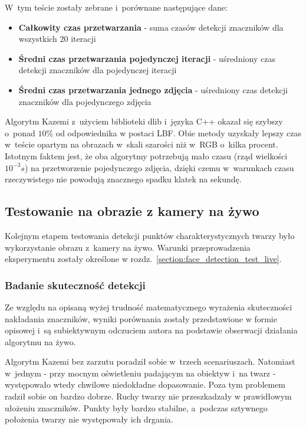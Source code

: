 W~tym teście zostały zebrane i~porównane następujące dane:

\begin{itemize}
    \item \textbf{Całkowity czas przetwarzania} - suma czasów detekcji znaczników dla wszystkich 20 iteracji
    \item \textbf{Średni czas przetwarzania pojedynczej iteracji} - uśredniony czas detekcji znaczników dla pojedynczej iteracji
    \item \textbf{Średni czas przetwarzania jednego zdjęcia} - uśredniony czas detekcji znaczników dla pojedynczego zdjęcia
\end{itemize}



Algorytm Kazemi z~użyciem biblioteki dlib i~języka C++ okazał się szybszy o~ponad $10\%$ od odpowiednika w postaci LBF. Obie metody uzyskały lepszy czas w~teście opartym na obrazach w~skali szarości niż w~RGB o~kilka procent. Istotnym faktem jest, że oba algorytmy potrzebują mało czasu (rząd wielkości $10^{-3} s$) na przetworzenie pojedynczego zdjęcia, dzięki czemu w~warunkach czasu rzeczywistego nie powodują znacznego spadku klatek na sekundę. 

\subsection{Testowanie na obrazie z kamery na żywo}

Kolejnym etapem testowania detekcji punktów charakterystycznych twarzy było wykorzystanie obrazu z~kamery na żywo. Warunki przeprowadzenia eksperymentu zostały określone w rozdz.~\hyperref[{section:face_detection_test_live}]{\ref{section:face_detection_test_live}}.

\subsubsection{Badanie skuteczność detekcji} \label{section:facemark_live_detection}

Ze względu na opisaną wyżej trudność matematycznego wyrażenia skuteczności nakładania znaczników, wyniki porównania zostały przedstawione w formie opisowej i~są subiektywnym odczuciem autora na podstawie obserwacji działania algorytmu na żywo.

\vspace{5mm}

Algorytm Kazemi bez zarzutu poradził sobie w~trzech scenariuszach. Natomiast w~jednym - przy mocnym oświetleniu padającym na obiektyw i~na twarz - występowało wtedy chwilowe niedokładne dopasowanie. Poza tym problemem radził sobie on bardzo dobrze. Ruchy twarzy nie przeszkadzały w prawidłowym ułożeniu znaczników. Punkty były bardzo stabilne, a~podczas sztywnego położenia twarzy nie występowały ich drgania.

